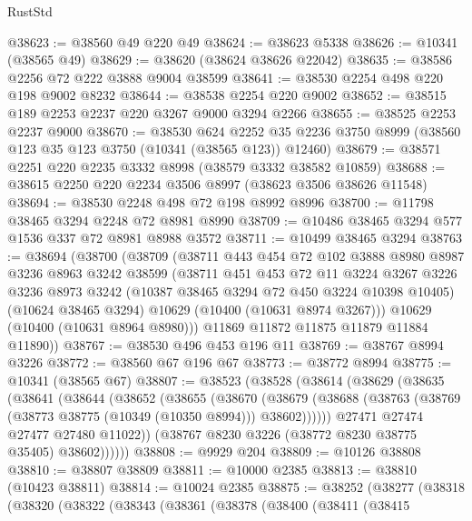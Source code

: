 \begin{lexlean}{RustStd}
\begin{coremodule}
@38623 := @38560 @49 @220 @49
@38624 := @38623 @5338
@38626 := @10341 (@38565 @49)
@38629 := @38620 (@38624 @38626 @22042)
@38635 := @38586 @2256 @72 @222 @3888 @9004 @38599
@38641 := @38530 @2254 @498 @220 @198 @9002 @8232
@38644 := @38538 @2254 @220 @9002
@38652 := @38515 @189 @2253 @2237 @220 @3267 @9000 @3294 @2266
@38655 := @38525 @2253 @2237 @9000
@38670 := @38530
    @624
    @2252
    @35
    @2236
    @3750
    @8999
    (@38560 @123 @35 @123 @3750 (@10341 (@38565 @123)) @12460)
@38679 := @38571 @2251 @220 @2235 @3332 @8998 (@38579 @3332 @38582 @10859)
@38688 := @38615 @2250 @220 @2234 @3506 @8997 (@38623 @3506 @38626 @11548)
@38694 := @38530 @2248 @498 @72 @198 @8992 @8996
@38700 := @11798 @38465 @3294 @2248 @72 @8981 @8990
@38709 := @10486 @38465 @3294 @577 @1536 @337 @72 @8981 @8988 @3572
@38711 := @10499 @38465 @3294
@38763 := @38694
    (@38700
      (@38709
        (@38711
          @443
          @454
          @72
          @102
          @3888
          @8980
          @8987
          @3236
          @8963
          @3242
          @38599
          (@38711
            @451
            @453
            @72
            @11
            @3224
            @3267
            @3226
            @3236
            @8973
            @3242
            (@10387 @38465 @3294 @72 @450 @3224 @10398 @10405)
            (@10624 @38465 @3294)
            @10629
            (@10400 (@10631 @8974 @3267)))
          @10629
          (@10400 (@10631 @8964 @8980)))
        @11869
        @11872
        @11875
        @11879
        @11884
        @11890))
@38767 := @38530 @496 @453 @196 @11
@38769 := @38767 @8994 @3226
@38772 := @38560 @67 @196 @67
@38773 := @38772 @8994
@38775 := @10341 (@38565 @67)
@38807 := @38523
    (@38528
      (@38614
        (@38629
          (@38635
            (@38641
              (@38644
                (@38652
                  (@38655
                    (@38670
                      (@38679
                        (@38688 (@38763 (@38769 (@38773 @38775 (@10349 (@10350 @8994))) @38602))))))
                  @27471
                  @27474
                  @27477
                  @27480
                  @11022))
              (@38767 @8230 @3226 (@38772 @8230 @38775 @35405) @38602))))))
@38808 := @9929 @204
@38809 := @10126 @38808
@38810 := @38807 @38809
@38811 := @10000 @2385
@38813 := @38810 (@10423 @38811)
@38814 := @10024 @2385
@38875 := @38252
    (@38277
      (@38318
        (@38320
          (@38322
            (@38343
              (@38361
                (@38378
                  (@38400
                    (@38411
                      (@38415

\end{coremodule}
\end{lexlean}
